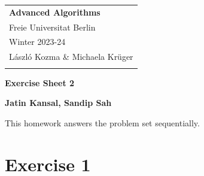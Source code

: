 \documentclass[a4paper,12pt]{article} %
\begin{document}



\thispagestyle{empty} %


\begin{tabular}{p{15.5cm}} %
{\large \bf Advanced Algorithms} \\
Freie Universitat Berlin \\ Winter 2023-24  \\ László Kozma \& Michaela Krüger\\
\hline %
\\
\end{tabular} %

\vspace*{0.3cm} %

\begin{center} %
	{\Large \bf Exercise Sheet 2} %
	\vspace{2mm}
	
	{\bf Jatin Kansal, Sandip Sah} %
		
\end{center}  

\vspace{0.4cm}



This homework answers the problem set sequentially. 

\section*{Exercise 1} 
\end{document}
